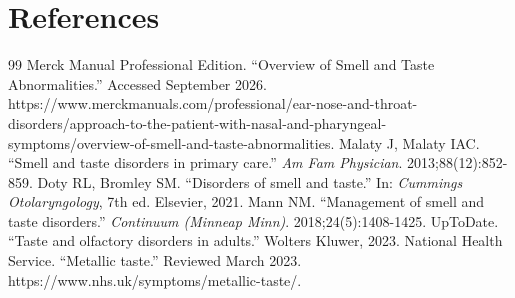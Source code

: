 \section*{References}
\begin{thebibliography}{99}
 Merck Manual Professional Edition. ``Overview of Smell and Taste Abnormalities.'' Accessed September 2026. https://www.merckmanuals.com/professional/ear-nose-and-throat-disorders/approach-to-the-patient-with-nasal-and-pharyngeal-symptoms/overview-of-smell-and-taste-abnormalities.
 Malaty J, Malaty IAC. ``Smell and taste disorders in primary care.'' \textit{Am Fam Physician}. 2013;88(12):852-859.
 Doty RL, Bromley SM. ``Disorders of smell and taste.'' In: \textit{Cummings Otolaryngology}, 7th ed. Elsevier, 2021.
 Mann NM. ``Management of smell and taste disorders.'' \textit{Continuum (Minneap Minn)}. 2018;24(5):1408-1425.
 UpToDate. ``Taste and olfactory disorders in adults.'' Wolters Kluwer, 2023.
 National Health Service. ``Metallic taste.'' Reviewed March 2023. https://www.nhs.uk/symptoms/metallic-taste/.
\end{thebibliography}
